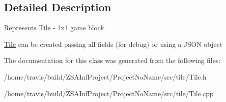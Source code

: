 \subsection{Detailed Description}
Represents \hyperlink{classTile}{Tile} -\/ 1x1 game block. 

\hyperlink{classTile}{Tile} can be created passing all fields (for debug) or using a J\-S\-O\-N object 

The documentation for this class was generated from the following files\-:\begin{DoxyCompactItemize}
\item 
/home/travis/build/\-Z\-S\-A\-Inf\-Project/\-Project\-No\-Name/src/tile/Tile.\-h\item 
/home/travis/build/\-Z\-S\-A\-Inf\-Project/\-Project\-No\-Name/src/tile/Tile.\-cpp\end{DoxyCompactItemize}
